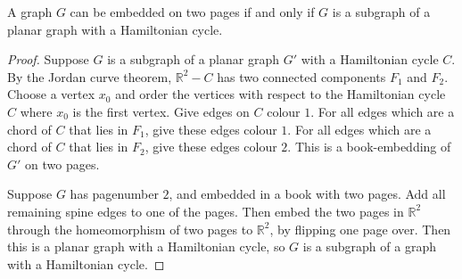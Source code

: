 \begin{lemma}\label{lem:Pagenumber_2}
	A graph \(G\) can be embedded on two pages if and only if \(G\) is a subgraph of a planar graph with a Hamiltonian cycle.
\end{lemma}

\begin{proof}
	Suppose $G$ is a subgraph of a planar graph $G'$ with a Hamiltonian cycle $C$. By the Jordan curve theorem, $\mathbb{R}^2 - C$ has two connected components $F_1$ and $F_2$. Choose a vertex $x_0$ and order the vertices with respect to the Hamiltonian cycle $C$ where $x_0$ is the first vertex. Give edges on $C$ colour $1$. For all edges which are a chord of $C$ that lies in $F_1$, give these edges colour $1$. For all edges which are a chord of $C$ that lies in $F_2$, give these edges colour $2$. This is a book-embedding of $G'$ on two pages. 
	\par
	Suppose $G$ has pagenumber $2$, and embedded in a book with two pages. Add all remaining spine edges to one of the pages. Then embed the two pages in $\mathbb{R}^2$ through the homeomorphism of two pages to $\mathbb{R}^2$, by flipping one page over. Then this is a planar graph with a Hamiltonian cycle, so $G$ is a subgraph of a graph with a Hamiltonian cycle.
\end{proof}
